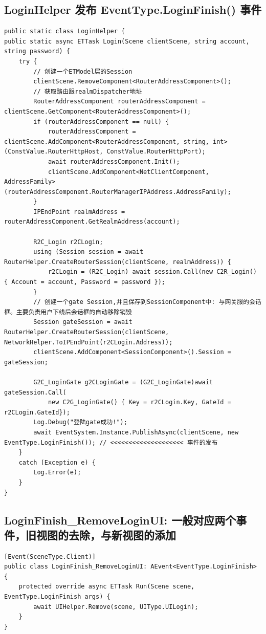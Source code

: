 \documentclass[9pt, b5paper]{article}
\begin{document}
\subsection{LoginHelper 发布 EventType.LoginFinish() 事件}
\label{sec-7-1}
\begin{verbatim}
public static class LoginHelper {
public static async ETTask Login(Scene clientScene, string account, string password) {
    try {
        // 创建一个ETModel层的Session
        clientScene.RemoveComponent<RouterAddressComponent>();
        // 获取路由跟realmDispatcher地址
        RouterAddressComponent routerAddressComponent = clientScene.GetComponent<RouterAddressComponent>();
        if (routerAddressComponent == null) {
            routerAddressComponent = clientScene.AddComponent<RouterAddressComponent, string, int>(ConstValue.RouterHttpHost, ConstValue.RouterHttpPort);
            await routerAddressComponent.Init();
            clientScene.AddComponent<NetClientComponent, AddressFamily>(routerAddressComponent.RouterManagerIPAddress.AddressFamily);
        }
        IPEndPoint realmAddress = routerAddressComponent.GetRealmAddress(account);

        R2C_Login r2CLogin;
        using (Session session = await RouterHelper.CreateRouterSession(clientScene, realmAddress)) {
            r2CLogin = (R2C_Login) await session.Call(new C2R_Login() { Account = account, Password = password });
        }
        // 创建一个gate Session,并且保存到SessionComponent中: 与网关服的会话框。主要负责用户下线后会话框的自动移除销毁
        Session gateSession = await RouterHelper.CreateRouterSession(clientScene, NetworkHelper.ToIPEndPoint(r2CLogin.Address));
        clientScene.AddComponent<SessionComponent>().Session = gateSession;

        G2C_LoginGate g2CLoginGate = (G2C_LoginGate)await gateSession.Call(
            new C2G_LoginGate() { Key = r2CLogin.Key, GateId = r2CLogin.GateId});
        Log.Debug("登陆gate成功!");
        await EventSystem.Instance.PublishAsync(clientScene, new EventType.LoginFinish()); // <<<<<<<<<<<<<<<<<<<< 事件的发布
    }
    catch (Exception e) {
        Log.Error(e);
    }
}
\end{verbatim}
\subsection{LoginFinish\_RemoveLoginUI: 一般对应两个事件，旧视图的去除，与新视图的添加}
\label{sec-7-2}
\begin{verbatim}
[Event(SceneType.Client)]
public class LoginFinish_RemoveLoginUI: AEvent<EventType.LoginFinish> {
    protected override async ETTask Run(Scene scene, EventType.LoginFinish args) {
        await UIHelper.Remove(scene, UIType.UILogin);
    }
}
\end{verbatim}
\end{document}
